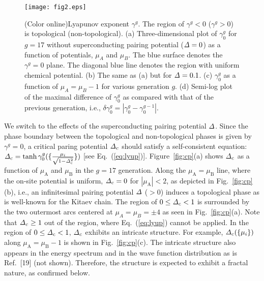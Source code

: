 \documentclass[%
superscriptaddress,
preprint,
amsmath,amssymb,
]{revtex4-1}
\newcommand{\mrm}{\mathrm}
\begin{document}
\begin{figure}
	\centering
	\texttt{[image: fig2.eps]}
	\caption{(Color online)Lyapunov exponent $\gamma^{g}$. The region of $\gamma^g<0$ ($\gamma^g>0$) is topological (non-topological).  
		(a) Three-dimensional plot of $\gamma_0^g$ for $g=17$ without superconducting pairing potential (${\it\Delta}=0$) as a function of potentials, $\mu_A$ and $\mu_B$. The blue surface denotes the $\gamma^g=0$ plane. The diagonal blue line denotes the region with uniform chemical potential. 
		(b) The same as (a) but for ${\it\Delta}=0.1$. 
		(c) $\gamma_0^g$ as a function of $\mu_A=\mu_B-1$ for various generation $g$. 
		(d) Semi-log plot of the maximal difference of $\gamma_0^g$ as compared with that of the previous generation, i.e., $\delta \gamma_0^g=|\gamma_0^g-\gamma_0^{g-1}|$.
	}
	\label{fig:lyap}
\end{figure}

We switch to the effects of the superconducting pairing potential ${\it\Delta}$.
Since the phase boundary between the topological and non-topological phases is given by $\gamma^g=0$, a critical paring potential ${\it\Delta}_{\mrm{c}}$ should satisfy a self-consistent equation: ${\it\Delta}_{\mrm{c}}=\tanh\gamma_0^g(\{\frac{\mu_i}{\sqrt{1-{\it\Delta}_{\mrm{c}}^2}}\})$ [see Eq.~(\ref{eq:lyup})].
Figure~\ref{fig:cp}(a) shows ${\it\Delta}_{\mrm{c}}$ as a function of $\mu_{\mrm{A}}$ and $\mu_{\mrm{B}}$ in the $g=17$ generation.
Along the $\mu_{\mrm{A}}=\mu_{\mrm{B}}$ line, where the on-site potential is uniform, ${\it\Delta}_{\mrm{c}}=0$ for $|\mu_{\mrm{A}}|<2$, as depicted in Fig.~\ref{fig:cp}(b), i.e., an infinitesimal pairing potential ${\it\Delta}$ ($>0$) induces a topological phase as is well-known for the Kitaev chain. 
The region of $0\le {\it\Delta}_{\mrm{c}}<1$ is surrounded by the two outermost arcs centered at $\mu_A=\mu_B=\pm4$ as seen in Fig.~\ref{fig:cp}(a).
Note that ${\it\Delta}_{\mrm{c}}\ge 1$ out of the region, where Eq.~(\ref{eq:lyup}) cannot be applied. 
In the region of $0\le {\it\Delta_{\mrm{c}}}<1$, ${\it\Delta}_{\mrm{c}}$ exhibits an intricate structure. For example, ${\it\Delta}_{\mrm{c}}(\{\mu_i\})$ along $\mu_{\mrm{A}}=\mu_{\mrm{B}}-1$ is shown in Fig.~\ref{fig:cp}(c). The intricate structure also appears in the energy spectrum and in the wave function distribution as is Ref.~[19] (not shown).
Therefore, the structure is expected to exhibit a fractal nature, as confirmed below.
\end{document}
